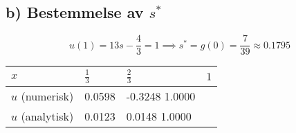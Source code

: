 
\pagebreak
\subsection*{b) Bestemmelse av $s^*$} %
\label{sub:bestemmelse_av_}
\begin{equation}
  u(1) = 13s- \frac{4}{3} = 1 \implies s^* = g(0) = \frac{7}{39} \approx0.1795
\end{equation}

\begin{table}[H]
  \centering
  \begin{tabularx}{1.0\textwidth}{X|XXX}
    \toprule
    $x$              & $\frac{1}{3}$ & $\frac{2}{3}$ & $1$ \\
    \midrule
    $u$ (numerisk)  & 0.0598        &-0.3248    1.0000    \\
    $u$ (analytisk) & 0.0123        & 0.0148    1.0000    \\
    \bottomrule
  \end{tabularx}
\end{table}













